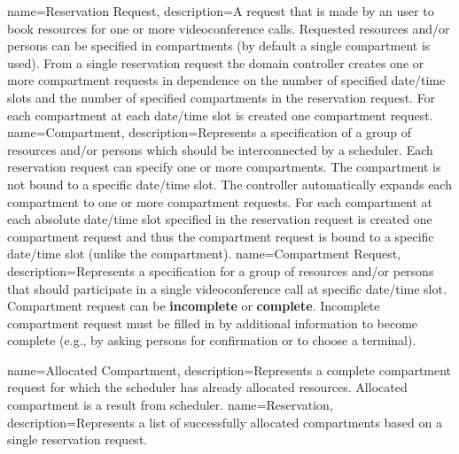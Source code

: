%
%
{
  name=Reservation Request,
  description={A request that is made by an user to book resources for one or 
    more videoconference calls. Requested resources and/or persons can be 
    specified in compartments (by default a single compartment is used). 
    From a single reservation request the domain controller creates 
    one or more compartment requests in dependence on the 
    number of specified date/time slots and the number of specified 
    compartments in the reservation request. For each compartment at each 
    date/time slot is created one compartment request.}
}
{
  name=Compartment,
  description={Represents a specification of a group of resources and/or 
    persons which should be interconnected by a scheduler. Each reservation 
    request can specify one or more compartments. The compartment is not
    bound to a specific date/time slot. The controller automatically expands 
    each compartment to one or more compartment requests. For each compartment 
    at each absolute date/time slot specified in the reservation request is 
    created one compartment request and thus the compartment request is bound 
    to a specific date/time slot (unlike the compartment).}
}
{
  name=Compartment Request,
  description={Represents a specification for a group of resources and/or
    persons that should participate in a single videoconference call at 
    specific date/time slot. Compartment request can be \textbf{incomplete} 
    or \textbf{complete}. Incomplete compartment request must be filled in by 
    additional information to become complete (e.g., by asking persons for 
    confirmation or to choose a terminal).}
}

{
  name=Allocated Compartment,
  description={Represents a complete compartment request for which the 
    scheduler has already allocated resources. Allocated compartment 
    is a result from scheduler.}
}
{
  name=Reservation,
  description={Represents a list of successfully allocated compartments
    based on a single reservation request.}
}

%
%

